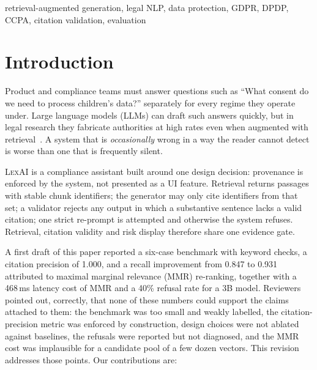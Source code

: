 \documentclass[conference]{IEEEtran}
\newcommand{\sys}{\textsc{LexAI}}
\begin{document}
\begin{IEEEkeywords}
retrieval-augmented generation, legal NLP, data protection, GDPR, DPDP, CCPA, citation validation, evaluation
\end{IEEEkeywords}

\section{Introduction}
Product and compliance teams must answer questions such as ``What consent do we need to process children's data?'' separately for every regime they operate under. Large language models (LLMs) can draft such answers quickly, but in legal research they fabricate authorities at high rates even when augmented with retrieval~\cite{dahl2024fictions,magesh2024hallucination}. A system that is \emph{occasionally} wrong in a way the reader cannot detect is worse than one that is frequently silent.

\sys{} is a compliance assistant built around one design decision: provenance is enforced by the system, not presented as a UI feature. Retrieval returns passages with stable chunk identifiers; the generator may only cite identifiers from that set; a validator rejects any output in which a substantive sentence lacks a valid citation; one strict re-prompt is attempted and otherwise the system refuses. Retrieval, citation validity and risk display therefore share one evidence gate.

A first draft of this paper reported a six-case benchmark with keyword checks, a citation precision of 1.000, and a recall improvement from 0.847 to 0.931 attributed to maximal marginal relevance (MMR) re-ranking, together with a 468\,ms latency cost of MMR and a 40\% refusal rate for a 3B model. Reviewers pointed out, correctly, that none of these numbers could support the claims attached to them: the benchmark was too small and weakly labelled, the citation-precision metric was enforced by construction, design choices were not ablated against baselines, the refusals were reported but not diagnosed, and the MMR cost was implausible for a candidate pool of a few dozen vectors. This revision addresses those points. Our contributions are:
\end{document}

